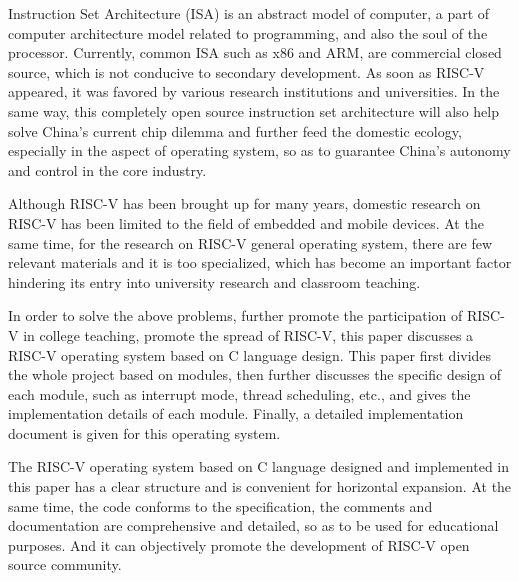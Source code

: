 \begin{eabstract}

Instruction Set Architecture (ISA) is an abstract model of computer, a part of computer architecture model related to programming, and also the soul of the processor. Currently, common ISA such as x86 and ARM, are commercial closed source, which is not conducive to secondary development. As soon as RISC-V appeared, it was favored by various research institutions and universities. In the same way, this completely open source instruction set architecture will also help solve China's current chip dilemma and further feed the domestic ecology, especially in the aspect of operating system, so as to guarantee China's autonomy and control in the core industry.

Although RISC-V has been brought up for many years, domestic research on RISC-V has been limited to the field of embedded and mobile devices. At the same time, for the research on RISC-V general operating system, there are few relevant materials and it is too specialized, which has become an important factor hindering its entry into university research and classroom teaching.

In order to solve the above problems, further promote the participation of RISC-V in college teaching, promote the spread of RISC-V, this paper discusses a RISC-V operating system based on C language design. This paper first divides the whole project based on modules, then further discusses the specific design of each module, such as interrupt mode, thread scheduling, etc., and gives the implementation details of each module. Finally, a detailed implementation document is given for this operating system.

The RISC-V operating system based on C language designed and implemented in this paper has a clear structure and is convenient for horizontal expansion. At the same time, the code conforms to the specification, the comments and documentation are comprehensive and detailed, so as to be used for educational purposes. And it can objectively promote the development of RISC-V open source community.

\end{eabstract}
